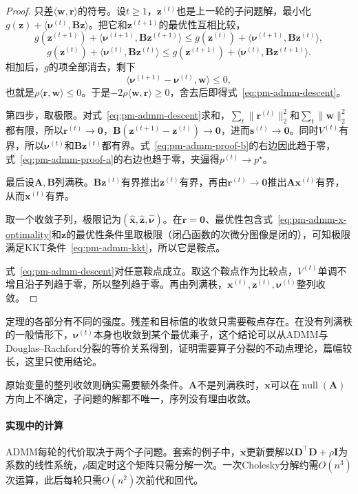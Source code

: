 \begin{proof}
只差$\langle\bm{w},\bm{r}\rangle$的符号。设$t\geq1$，$\bm{z}^{(t)}$也是上一轮的子问题解，最小化$g(\bm{z})+\langle\bm{\nu}^{(t)},\bm{B}\bm{z}\rangle$。把它和$\bm{z}^{(t+1)}$的最优性互相比较，
\[
 g(\bm{z}^{(t+1)})+\langle\bm{\nu}^{(t+1)},\bm{B}\bm{z}^{(t+1)}\rangle\leq g(\bm{z}^{(t)})+\langle\bm{\nu}^{(t+1)},\bm{B}\bm{z}^{(t)}\rangle,
\]
\[
 g(\bm{z}^{(t)})+\langle\bm{\nu}^{(t)},\bm{B}\bm{z}^{(t)}\rangle\leq g(\bm{z}^{(t+1)})+\langle\bm{\nu}^{(t)},\bm{B}\bm{z}^{(t+1)}\rangle .
\]
相加后，$g$的项全部消去，剩下
\[
 \langle\bm{\nu}^{(t+1)}-\bm{\nu}^{(t)},\bm{w}\rangle\leq0 ,
\]
也就是$\rho\langle\bm{r},\bm{w}\rangle\leq0$。于是$-2\rho\langle\bm{w},\bm{r}\rangle\geq0$，舍去后即得式~\eqref{eq:pm-admm-descent}。

第四步，取极限。对式~\eqref{eq:pm-admm-descent}求和，$\sum_t\lVert\bm{r}^{(t)}\rVert_2^2$和$\sum_t\lVert\bm{w}\rVert_2^2$都有限，所以$\bm{r}^{(t)}\to\bm{0}$，$\bm{B}(\bm{z}^{(t+1)}-\bm{z}^{(t)})\to\bm{0}$，进而$\bm{s}^{(t)}\to\bm{0}$。同时$V^{(t)}$有界，所以$\bm{\nu}^{(t)}$和$\bm{B}\bm{z}^{(t)}$都有界。式~\eqref{eq:pm-admm-proof-b}的右边因此趋于零，式~\eqref{eq:pm-admm-proof-a}的右边也趋于零，夹逼得$p^{(t)}\to p^\star$。

最后设$\bm{A},\bm{B}$列满秩。$\bm{B}\bm{z}^{(t)}$有界推出$\bm{z}^{(t)}$有界，再由$\bm{r}^{(t)}\to\bm{0}$推出$\bm{A}\bm{x}^{(t)}$有界，从而$\bm{x}^{(t)}$有界。

取一个收敛子列，极限记为$(\hat{\bm{x}},\hat{\bm{z}},\hat{\bm{\nu}})$。在$\bm{r}=\bm{0}$、最优性包含式~\eqref{eq:pm-admm-x-optimality}和$\bm{z}$的最优性条件里取极限（闭凸函数的次微分图像是闭的），可知极限满足KKT条件~\eqref{eq:pm-admm-kkt}，所以它是鞍点。

式~\eqref{eq:pm-admm-descent}对任意鞍点成立。取这个鞍点作为比较点，$V^{(t)}$单调不增且沿子列趋于零，所以整列趋于零。再由列满秩，$\bm{x}^{(t)},\bm{z}^{(t)},\bm{\nu}^{(t)}$整列收敛。
\end{proof}

定理的各部分有不同的强度。残差和目标值的收敛只需要鞍点存在。在没有列满秩的一般情形下，$\bm{\nu}^{(t)}$本身也收敛到某个最优乘子，这个结论可以从ADMM与Douglas--Rachford分裂的等价关系得到，证明需要算子分裂的不动点理论，篇幅较长，这里只使用结论。

原始变量的整列收敛则确实需要额外条件。$\bm{A}$不是列满秩时，$\bm{x}$可以在$\operatorname{null}(\bm{A})$方向上不确定，子问题的解都不唯一，序列没有理由收敛。

\paragraph{实现中的计算}
ADMM每轮的代价取决于两个子问题。套索的例子中，$\bm{x}$更新要解以$\bm{D}^\top\bm{D}+\rho\bm{I}$为系数的线性系统，$\rho$固定时这个矩阵只需分解一次。一次Cholesky分解约需$O(n^3)$次运算，此后每轮只需$O(n^2)$次前代和回代。

